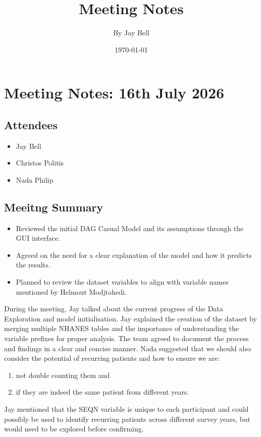 \documentclass[12pt]{article}
\title{Meeting Notes}
\author{By Jay Bell}
\date{\today}
\begin{document}
\maketitle

\section{Meeting Notes: 16th July 2026}
\subsection{Attendees}

\begin{itemize}
    \item Jay Bell
    \item Christos Politis
    \item Nada Philip
\end{itemize}

\subsection{Meeitng Summary}

\begin{itemize}
    \item Reviewed the initial DAG Casual Model and its assumptions through the GUI interface.
    \item Agreed on the need for a clear explanation of the model and how it predicts the results.
    \item Planned to review the dataset variables to align with variable names mentioned by Helmout Modjtahedi.
\end{itemize}

During the meeting, Jay talked about the current progress of the Data Exploration and model initialisation. Jay explained the creation of the dataset by merging multiple NHANES tables and the importance of understanding the variable prefixes for proper analysis. The team agreed to document the process and findings in a clear and concise manner. Nada suggested that we should also consider the potential of recurring patients and how to ensure we are:
\begin{enumerate}
    \item not double counting them and 
    \item if they are indeed the same patient from different years.
\end{enumerate}
Jay mentioned that the SEQN variable is unique to each participant and could possibly be used to identify recurring patients across different survey years, but would need to be explored before confirming.
\end{document}
